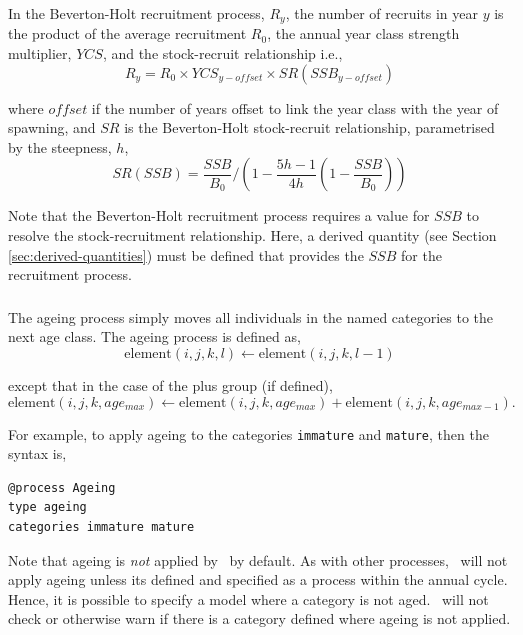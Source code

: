 In the Beverton-Holt recruitment process, $R_y$, the number of recruits in year $y$ is the product of the average recruitment $R_0$, the annual year class strength multiplier, $YCS$, and the stock-recruit relationship i.e.,
\begin{equation}
  R_y = R_0 \times YCS_{y-offset} \times SR(SSB_{y-offset})
\end{equation}

where $offset$ if the number of years offset to link the year class with the year of spawning, and $SR$ is the Beverton-Holt stock-recruit relationship, parametrised by the steepness, $h$,
\begin{equation}
SR(SSB) = \frac{SSB}{B_0} / \left( 1-\frac{5h-1}{4h} \left( 1-\frac{SSB}{B_0} \right) \right)
\end{equation}

Note that the Beverton-Holt recruitment process requires a value for $SSB$ to resolve the stock-recruitment relationship. Here, a derived quantity (see Section \ref{sec:derived-quantities}) must be defined that provides the $SSB$ for the recruitment process.

\subsubsection{\label{sec:ageing}}

The ageing process simply moves all individuals in the named categories to the next age class. The ageing process is defined as,
\begin{equation}
  \text{element}(i,j,k,l) \leftarrow \text{element}(i,j,k,l-1)
\end{equation}

except that in the case of the plus group (if defined), 
\begin{equation}
  \text{element}(i,j,k,age_{max}) \leftarrow \text{element}(i,j,k,age_{max}) + \text{element}(i,j,k,age_{max-1}).
\end{equation}

For example, to apply ageing to the categories \texttt{immature} and \texttt{mature}, then the syntax is,

\begin{verbatim}
@process Ageing
type ageing
categories immature mature
\end{verbatim}

Note that ageing is \emph{not} applied by \SPM\ by default. As with other processes, \SPM\ will not apply ageing unless its defined and specified as a process within the annual cycle. Hence, it is possible to specify a model where a category is not aged. \SPM\ will not check or otherwise warn if there is a category defined where ageing is not applied.

